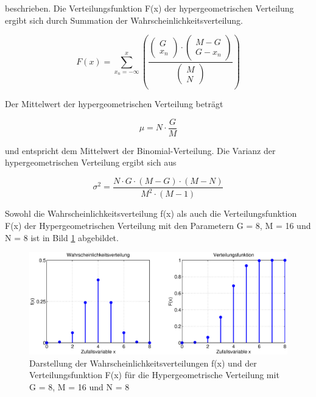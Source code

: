 \noindent beschrieben. Die Verteilungsfunktion F(x) der hypergeometrischen Verteilung ergibt sich durch Summation der Wahrscheinlichkeitsverteilung.

\begin{equation}\label{eq:fourhundredthirtynine}
F\left(x\right)=\sum _{x_{n} =-\infty }^{x}\left(\dfrac{\left(\begin{array}{l} {G} \\ {x_{n} } \end{array}\right)\cdot \left(\begin{array}{l} {M-G} \\ {G-x_{n} } \end{array}\right)}{\left(\begin{array}{l} {M} \\ {N} \end{array}\right)} \right)
\end{equation}

\noindent Der Mittelwert der hypergeometrischen Verteilung betr\"{a}gt 

\begin{equation}\label{eq:fourhundredfourty}
\mu =N\cdot \dfrac{G}{M}
\end{equation}

\noindent und entspricht dem Mittelwert der Binomial-Verteilung. Die Varianz der hypergeometrischen Verteilung ergibt sich aus

\begin{equation}\label{eq:fourhundredfourtyone}
\sigma ^{2} =\dfrac{N\cdot G\cdot (M-G)\cdot (M-N)}{M^{2} \cdot (M-1)}
\end{equation}

\noindent Sowohl die Wahrscheinlichkeitsverteilung f(x) als auch die Verteilungsfunktion F(x) der Hypergeometrischen Verteilung mit den Parametern G = 8, M = 16 und N = 8 ist in Bild \ref{fig:Diskret_Hypergeometrisch1} abgebildet.

\noindent 
\begin{figure}[H]
  \centerline{\includegraphics[width=1\textwidth]{Kapitel4/Bilder/image15}}
  \caption{Darstellung der Wahrscheinlichkeitsverteilungen f(x) und der Verteilungsfunktion F(x) f\"{u}r die Hypergeometrische Verteilung mit G = 8, M = 16 und N = 8}
  \label{fig:Diskret_Hypergeometrisch1}
\end{figure}

